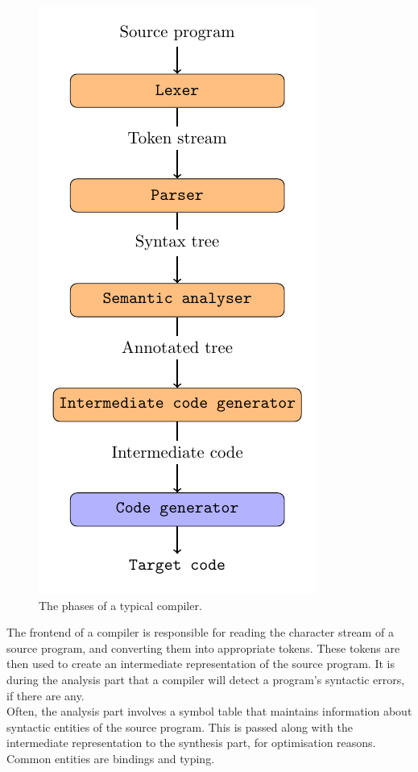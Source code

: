 \begin{figure}[ht]
    \centering
    \includegraphics[scale=0.7]{assets/chapter2/PhasesOfCompiler.pdf}
    \caption{The phases of a typical compiler.}
    \label{compilerPhases}
\end{figure}

The frontend of a compiler is responsible for reading the character stream of a source program, and converting them into appropriate tokens. These tokens are then used to create an intermediate representation of the source program. It is during the analysis part that a compiler will detect a program's syntactic errors, if there are any. \\

Often, the analysis part involves a symbol table that maintains information about syntactic entities of the source program. This is passed along with the intermediate representation to the synthesis part, for optimisation reasons. Common entities are bindings and typing. \\

